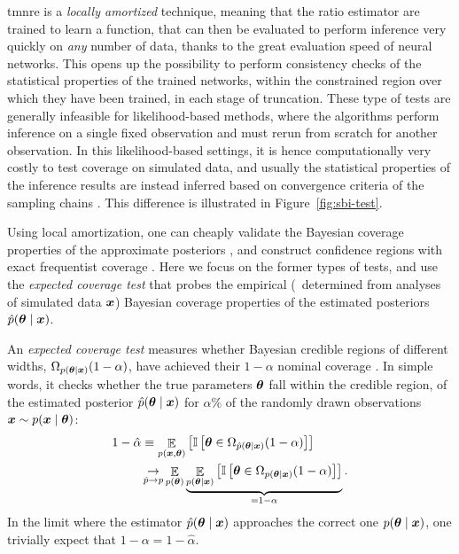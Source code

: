 \gls*{tmnre} is a \emph{locally amortized} technique, meaning that the ratio estimator are trained to learn a function, that can then be evaluated to perform inference very quickly on \emph{any} number of data, thanks to the great evaluation speed of neural networks. This opens up the possibility to perform consistency checks of the statistical properties of the trained networks, within the constrained region over which they have been trained, in each stage of truncation. These type of tests are generally infeasible for likelihood-based methods, where the algorithms perform inference on a single fixed observation and must rerun from scratch for another observation. In this likelihood-based settings, it is hence computationally very costly to test coverage on simulated data, and usually the statistical properties of the inference results are instead inferred based on convergence criteria of the sampling chains \cite[\eg][]{vivekan2019convergence}. This difference is illustrated in Figure~\ref{fig:sbi-test}.

Using local amortization, one can cheaply validate the Bayesian coverage properties of the approximate posteriors \cite{Hermans:2021rqv, Cole:2021gwr, Karchev:2022xyn}, and construct confidence regions with exact frequentist coverage \cite{Karchev:2022xyn, dalmasso2020confidence, dalmasso2021likelihood}. Here we focus on the former types of tests, and use the \emph{expected coverage test} that probes the empirical (\ie~determined from analyses of simulated data $\bm{x}$) Bayesian coverage properties of the estimated posteriors $\hat{p}(\bm{\theta} \mid \bm{x})$.

An \emph{expected coverage test} measures whether Bayesian credible regions of different widths, $\Omega_{p(\bm{\theta} \mid \bm{x})}(1-\alpha)$, have achieved their $1-\alpha$ nominal coverage \cite{Hermans:2021rqv, Cole:2021gwr}. In simple words, it checks whether the true parameters $\bm{\theta}$ fall within the credible region, of the estimated posterior $\hat{p}(\bm{\theta}\mid\bm{x})$ for $\alpha\%$ of the randomly drawn observations $\bm{x} \sim p(\bm{x}\mid\bm{\theta})$:
%
\begin{align}
	1-\hat{\alpha} &\equiv \mathop{\mathbb{E}}\limits_{p(\bm{x}, \bm{\theta})} \left[ \mathbb{I} \left[ \bm{\theta} \in \Omega_{\hat{p}(\bm{\theta} \mid \bm{x})}(1-\alpha) \right] \right] \\
		& \mathop{\rightarrow}\limits_{\hat{p} \rightarrow p}  \mathop{\mathbb{E}}\limits_{p(\bm{\theta})} \underbrace{\mathop{\mathbb{E}}\limits_{p(\bm{\theta}\mid\bm{x})} \left[ \mathbb{I} \left[ \bm{\theta} \in \Omega_{p(\bm{\theta} \mid \bm{x})}(1-\alpha) \right] \right]}_{ = 1-\alpha}.
\end{align}
%
In the limit where the estimator $\hat{p}(\bm{\theta}\mid\bm{x})$ approaches the correct one ${p}(\bm{\theta}\mid\bm{x})$, one trivially expect that $1-\alpha=1-\hat{\alpha}$. 

